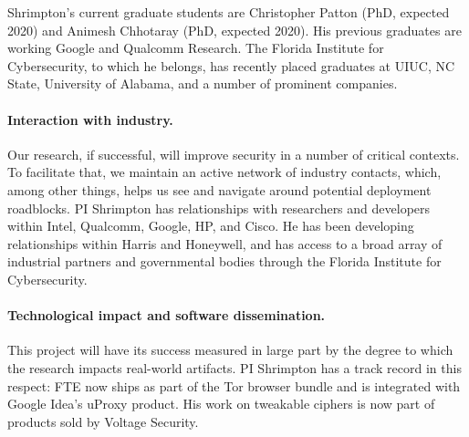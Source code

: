Shrimpton's current graduate students are Christopher Patton (PhD,
expected 2020) and Animesh Chhotaray (PhD, expected 2020).  His
previous graduates are working Google and Qualcomm Research.  The Florida
Institute for Cybersecurity, to which he belongs, has recently placed
graduates at UIUC, NC State, University of Alabama, and a number of
prominent companies.




\paragraph{Interaction with industry.} Our research, if successful, will improve
security in a number of critical contexts. To facilitate that, we maintain an
active network of industry contacts, which, among other things, helps us see and
navigate around potential deployment roadblocks.
%
PI Shrimpton has relationships with researchers and developers within
Intel, Qualcomm, Google, HP, and Cisco.  He has been developing
relationships within Harris and Honeywell, and has access to a broad
array of industrial partners and governmental bodies through the Florida Institute for
Cybersecurity.

\paragraph{Technological impact and software dissemination.}
This project will have its success measured in large part by
the degree to which the research impacts real-world artifacts.  
PI Shrimpton has a track record in this respect: FTE now ships as
part of the Tor browser bundle and is integrated with Google Idea's
uProxy product. His work on tweakable ciphers is now part of
products sold by Voltage Security.




